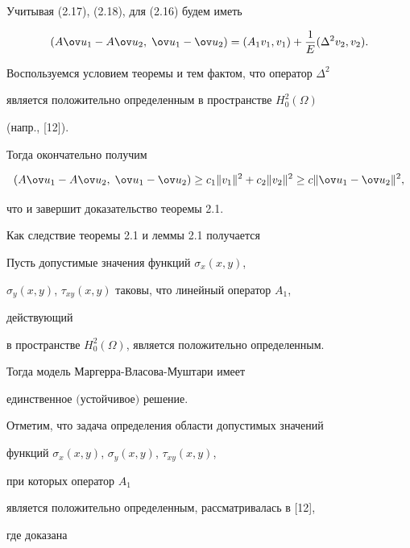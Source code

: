 Учитывая (2.17), (2.18), для (2.16) будем иметь 


$$ 


(A\ov u_1-A\ov u_2,\;\ov u_1-\ov u_2)=(A_1v_1,v_1)+ 


\frac{1}{E}(\Delta^2v_2,v_2).


$$ 


Воспользуемся условием теоремы и тем фактом, что оператор $\Delta^2$ 


является положительно определенным в пространстве $H^2_0(\Omega)$ 


(напр., [12]). 


Тогда окончательно получим 


$$ 


(A\ov u_1-A\ov u_2,\;\ov u_1-\ov u_2)\ge c_1\|v_1\|^2 


+c_2\|v_2\|^2\ge c\|\ov u_1-\ov u_2\|^2, 


$$ 


что и завершит доказательство теоремы 2.1. 


\medskip 


 


Как следствие теоремы 2.1 и леммы 2.1 получается 


 


\begin{thms} Пусть допустимые значения функций $\sigma_x(x,y)$, 


$\sigma_y(x,y)$, $\tau_{xy}(x,y)$ таковы, что линейный оператор $A_1$, 


действующий 


в пространстве $H^2_0(\Omega)$, является положительно определенным. 


Тогда модель Маргерра-Власова-Муштари имеет 


единственное $($устойчивое$)$ решение. 


\end{thms} 


 


Отметим, что задача определения области допустимых значений 


функций $\sigma_x(x,y)$, $\sigma_y(x,y)$, $\tau_{xy}(x,y)$, 


при которых оператор $A_1$ 


является положительно определенным, рассматривалась в [12], 


где доказана 


